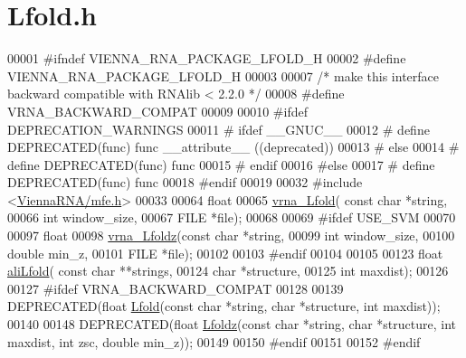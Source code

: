 \hypertarget{Lfold_8h_source}{}\section{Lfold.\+h}
\label{Lfold_8h_source}

\begin{DoxyCode}
00001 \textcolor{preprocessor}{#ifndef VIENNA\_RNA\_PACKAGE\_LFOLD\_H}
00002 \textcolor{preprocessor}{#define VIENNA\_RNA\_PACKAGE\_LFOLD\_H}
00003 
00007 \textcolor{comment}{/* make this interface backward compatible with RNAlib < 2.2.0 */}
00008 \textcolor{preprocessor}{#define VRNA\_BACKWARD\_COMPAT}
00009 
00010 \textcolor{preprocessor}{#ifdef DEPRECATION\_WARNINGS}
00011 \textcolor{preprocessor}{# ifdef \_\_GNUC\_\_}
00012 \textcolor{preprocessor}{#  define DEPRECATED(func) func \_\_attribute\_\_ ((deprecated))}
00013 \textcolor{preprocessor}{# else}
00014 \textcolor{preprocessor}{#  define DEPRECATED(func) func}
00015 \textcolor{preprocessor}{# endif}
00016 \textcolor{preprocessor}{#else}
00017 \textcolor{preprocessor}{# define DEPRECATED(func) func}
00018 \textcolor{preprocessor}{#endif}
00019 
00032 \textcolor{preprocessor}{#include <\hyperlink{mfe_8h}{ViennaRNA/mfe.h}>}
00033 
00064 \textcolor{keywordtype}{float}
00065 \hyperlink{group__local__mfe__fold_ga4918cce52bf69c1913cda503b2ac75d8}{vrna\_Lfold}( \textcolor{keyword}{const} \textcolor{keywordtype}{char} *\textcolor{keywordtype}{string},
00066             \textcolor{keywordtype}{int} window\_size,
00067             FILE  *file);
00068 
00069 \textcolor{preprocessor}{#ifdef USE\_SVM}
00070 
00097 \textcolor{keywordtype}{float}
00098 \hyperlink{group__local__mfe__fold_ga27fddda5fc63eb49c861e38845fc34b4}{vrna\_Lfoldz}(\textcolor{keyword}{const} \textcolor{keywordtype}{char} *\textcolor{keywordtype}{string},
00099             \textcolor{keywordtype}{int} window\_size,
00100             \textcolor{keywordtype}{double} min\_z,
00101             FILE *file);
00102 
00103 \textcolor{preprocessor}{#endif}
00104 
00105 
00123 \textcolor{keywordtype}{float} \hyperlink{group__local__consensus__fold_ga20a173a3cdb83f5d1778e36c1a6b1f2b}{aliLfold}( \textcolor{keyword}{const} \textcolor{keywordtype}{char} **strings,
00124                 \textcolor{keywordtype}{char} *structure,
00125                 \textcolor{keywordtype}{int} maxdist);
00126 
00127 \textcolor{preprocessor}{#ifdef  VRNA\_BACKWARD\_COMPAT}
00128 
00139 DEPRECATED(\textcolor{keywordtype}{float} \hyperlink{group__local__mfe__fold_ga16e5a70e60835bb969eaecbe6482f1be}{Lfold}(\textcolor{keyword}{const} \textcolor{keywordtype}{char} *\textcolor{keywordtype}{string}, \textcolor{keywordtype}{char} *structure, \textcolor{keywordtype}{int} maxdist));
00140 
00148 DEPRECATED(\textcolor{keywordtype}{float} \hyperlink{group__local__mfe__fold_gab6d79eecc180f586679f7b85cce5cbe9}{Lfoldz}(\textcolor{keyword}{const} \textcolor{keywordtype}{char} *\textcolor{keywordtype}{string}, \textcolor{keywordtype}{char} *structure, \textcolor{keywordtype}{int} maxdist, \textcolor{keywordtype}{int} zsc, \textcolor{keywordtype}{double} min\_z));
00149 
00150 \textcolor{preprocessor}{#endif}
00151 
00152 \textcolor{preprocessor}{#endif}
\end{DoxyCode}
